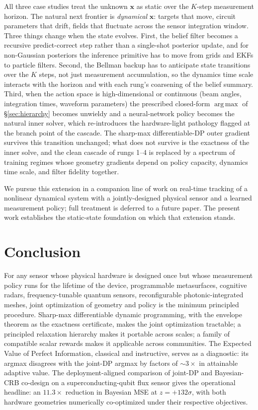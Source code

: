 \documentclass[11pt,a4paper,onecolumn]{article}
\newcommand{\argmax}{\operatorname*{arg\,max}}
\newcommand{\bx}{\bm{x}}
\begin{document}
All three case studies treat the unknown $\bx$ as static over the $K$-step measurement horizon.  The natural next frontier is \emph{dynamical} $\bx$: targets that move, circuit parameters that drift, fields that fluctuate across the sensor integration window.  Three things change when the state evolves.  First, the belief filter becomes a recursive predict-correct step rather than a single-shot posterior update, and for non-Gaussian posteriors the inference primitive has to move from grids and EKFs to particle filters.  Second, the Bellman backup has to anticipate state transitions over the $K$ steps, not just measurement accumulation, so the dynamics time scale interacts with the horizon and with each rung's coarsening of the belief summary.  Third, when the action space is high-dimensional or continuous (beam angles, integration times, waveform parameters) the prescribed closed-form $\argmax$ of §\ref{sec:hierarchy} becomes unwieldy and a neural-network policy becomes the natural inner solver, which re-introduces the hardware-light pathology flagged at the branch point of the cascade.  The sharp-max differentiable-DP outer gradient survives this transition unchanged; what does not survive is the exactness of the inner solve, and the clean cascade of rungs 1--4 is replaced by a spectrum of training regimes whose geometry gradients depend on policy capacity, dynamics time scale, and filter fidelity together.

We pursue this extension in a companion line of work on real-time tracking of a nonlinear dynamical system with a jointly-designed physical sensor and a learned measurement policy; full treatment is deferred to a future paper.  The present work establishes the static-state foundation on which that extension stands.

\section{Conclusion}
\label{sec:conclusion}

For any sensor whose physical hardware is designed once but whose measurement policy runs for the lifetime of the device, programmable metasurfaces, cognitive radars, frequency-tunable quantum sensors, reconfigurable photonic-integrated meshes, joint optimization of geometry and policy is the minimum principled procedure.  Sharp-max differentiable dynamic programming, with the envelope theorem as the exactness certificate, makes the joint optimization tractable; a principled relaxation hierarchy makes it portable across scales; a family of compatible scalar rewards makes it applicable across communities.  The Expected Value of Perfect Information, classical and instructive, serves as a diagnostic: its argmax disagrees with the joint-DP argmax by factors of $\sim\!3\times$ in attainable adaptive value.  The deployment-aligned comparison of joint-DP and Bayesian-CRB co-design on a superconducting-qubit flux sensor gives the operational headline: an $11.3\times$ reduction in Bayesian MSE at $z = +132\sigma$, with both hardware geometries numerically co-optimized under their respective objectives.
\end{document}
